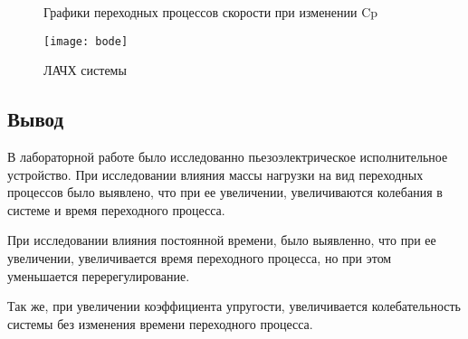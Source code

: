 \documentclass[a4paper, 12pt]{article}
\begin{document}
\newpage
\begin{figure}[h!]
\begin{minipage}[h]{0.49\linewidth}
\end{minipage}
\hfill
\begin{minipage}[h]{0.49\linewidth}
\end{minipage}
\vfill
\begin{minipage}[h]{0.49\linewidth}
\end{minipage}
\caption{Графики переходных процессов скорости при изменении Cp}
\end{figure}
\begin{figure}[h!]
	\begin{center}
		\texttt{[image: bode]}
		\caption{ЛАЧХ системы}
	\end{center}  
\end{figure} 
\newpage
\begin{center}
	\section*{Вывод}
\end{center}\par
В лабораторной работе было исследованно пьезоэлектрическое исполнительное устройство. При исследовании влияния массы нагрузки на вид переходных процессов было выявлено, что при ее увеличении, увеличиваются колебания в системе и время переходного процесса.\par
При исследовании влияния постоянной времени, было выявленно, что при ее увеличении, увеличивается время переходного процесса, но при этом уменьшается перерегулирование.\par
Так же, при увеличении коэффициента упругости, увеличивается колебательность системы без изменения времени переходного процесса.
\end{document}
